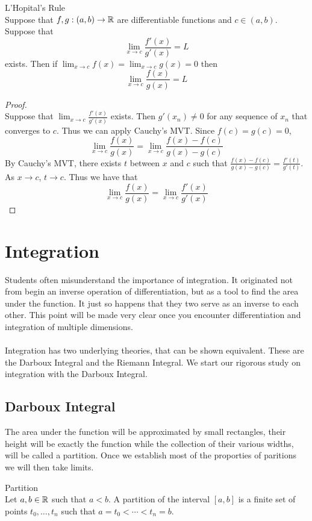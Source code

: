 \documentclass[a4paper]{article}
\begin{document}
\begin{thm}{L'Hopital's Rule}{}\\ Suppose that $f,g:(a,b)\to\mathbb{R}$ are differentiable functions and $c\in(a,b)$. Suppose that $$\lim_{x\to c}\frac{f'(x)}{g'(x)}=L$$ exists. Then if $\lim_{x\to c}f(x)=\lim_{x\to c}g(x)=0$ then $$\lim_{x\to c}\frac{f(x)}{g(x)}=L$$ 
\begin{proof}\\ Suppose that $\lim_{x\to c}\frac{f'(x)}{g'(x)}$ exists. Then $g'(x_n)\neq0$ for any sequence of $x_n$ that converges to $c$. Thus we can apply Cauchy's MVT. Since $f(c)=g(c)=0$, $$\lim_{x\to c}\frac{f(x)}{g(x)}=\lim_{x\to c}\frac{f(x)-f(c)}{g(x)-g(c)}$$ By Cauchy's MVT, there exists $t$ between $x$ and $c$ such that $\frac{f(x)-f(c)}{g(x)-g(c)}=\frac{f'(t)}{g'(t)}$. As $x\to c$, $t\to c$. Thus we have that $$\lim_{x\to c}\frac{f(x)}{g(x)}=\lim_{x\to c}\frac{f'(x)}{g'(x)}$$
\end{proof}
\end{thm}

\pagebreak
\section{Integration}
Students often misunderstand the importance of integration. It originated not from begin an inverse operation of differentiation, but as a tool to find the area under the function. It just so happens that they two serve as an inverse to each other. This point will be made very clear once you encounter differentiation and integration of multiple dimensions. \\~\\
Integration has two underlying theories, that can be shown equivalent. These are the Darboux Integral and the Riemann Integral. We start our rigorous study on integration with the Darboux Integral. 

\subsection{Darboux Integral}
The area under the function will be approximated by small rectangles, their height will be exactly the function while the collection of their various widths, will be called a partition. Once we establish most of the proporties of paritions we will then take limits. 
\begin{defn}{Partition}{}\\
Let $a,b\in\mathbb{R}$ such that $a<b$. A partition of the interval $[a,b]$ is a finite set of points $t_0,\dots,t_n$ such that $a=t_0<\cdots<t_n=b$. 
\end{defn}
\end{document}
